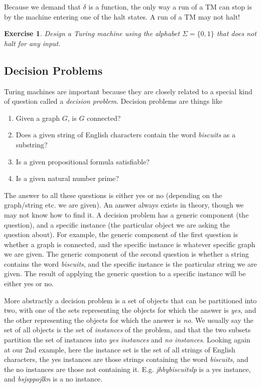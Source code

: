 \documentclass{article}
\theoremstyle{plain}
\newtheorem{exercise}[theorem]{Exercise}{\bfseries}{\upshape}
\begin{document}
Because we demand that $\delta$ is a function, the only way a run of a TM can stop is by the machine entering one of the halt states. A run of a TM may not halt! 

\begin{exercise}
Design a Turing machine using the alphabet $\Sigma=\{0,1\}$ that does not halt for any input.
\end{exercise}



\subsection{Decision Problems}
Turing machines are important because they are closely related to a special kind of question called a \emph{decision problem}. Decision problems are things like
\begin{enumerate}
\item Given a graph $G$, is $G$ connected?
\item Does a given string of English characters contain the word \emph{biscuits} as a substring?
\item Is a given propositional formula satisfiable?
\item Is a given natural number prime?
\end{enumerate}

The answer to all these questions is either yes or no (depending on the graph/string etc. we are given). An answer always exists in theory, though we may not know how to find it. A decision problem has a generic component (the question), and a specific instance (the particular object we are asking the question about). For example, the generic component of the first question is whether a graph is connected, and the specific instance is whatever specific graph we are given. The generic component of the second question is whether a string contains the word \emph{biscuits}, and the specific instance is the particular string we are given. The result of applying the generic question to a specific instance will be either yes or no.

More abstractly a decision problem is a set of objects that can be partitioned into two, with one of the sets representing the objects for which the answer is \emph{yes}, and the other representing the objects for which the answer is \emph{no}. We usually say the set of all objects is the set of \emph{instances} of the problem, and that the two subsets partition the set of instances into \emph{yes instances} and \emph{no instances}. Looking again at our 2nd example, here the instance set is the set of all strings of English characters, the yes instances are those strings containing the word \emph{biscuits}, and the no instances are those not containing it. E.g. \emph{jhbybiscuitslp} is a yes instance, and \emph{bsjsppojlkn} is a no instance. 
\end{document}
